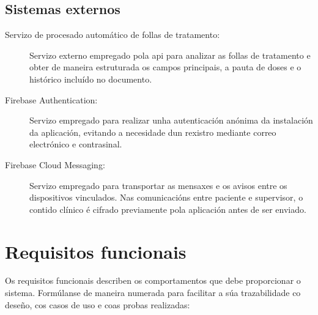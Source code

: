 \subsection*{Sistemas externos}

\begin{description}
\item[Servizo de procesado automático de follas de tratamento:] Servizo externo empregado pola \gls{api} para analizar as follas de tratamento e obter de maneira estruturada os campos principais, a pauta de doses e o histórico incluído no documento.


\item[Firebase Authentication:] Servizo empregado para realizar unha autenticación anónima da instalación da aplicación, evitando a necesidade dun rexistro mediante correo electrónico e contrasinal.

\item[Firebase Cloud Messaging:] Servizo empregado para transportar as mensaxes e os avisos entre os dispositivos vinculados. Nas comunicacións entre paciente e supervisor, o contido clínico é cifrado previamente pola aplicación antes de ser enviado.


\end{description}

\section{Requisitos funcionais}
\label{sec:requisitos-funcionais}

Os requisitos funcionais describen os comportamentos que debe proporcionar o sistema. Formúlanse de maneira numerada para facilitar a súa trazabilidade co deseño, cos casos de uso e coas probas realizadas:

